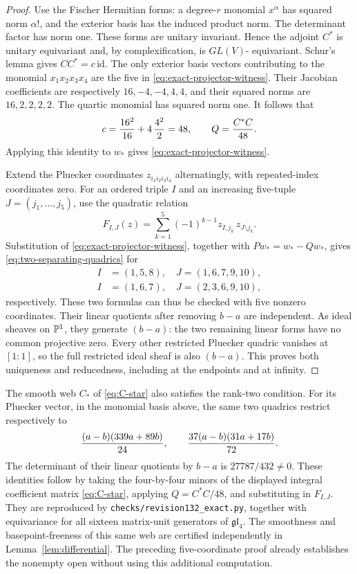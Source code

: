 \begin{proof}
Use the Fischer Hermitian forms: a degree-\(r\) monomial
\(x^\alpha\) has squared norm \(\alpha!\), and the exterior
basis has the induced product norm.  The determinant factor has norm
one.  These forms are unitary invariant.  Hence the adjoint \(C^*\)
is unitary equivariant and, by complexification, is \(GL(V)\)-
equivariant.  Schur's lemma gives \(CC^*=c\,\mathrm{id}\).
The only exterior basis vectors contributing to the monomial
\(x_1x_2x_3x_4\) are the five in
\eqref{eq:exact-projector-witness}.  Their Jacobian coefficients
are respectively \(16,-4,-4,4,4\), and their squared norms are
\(16,2,2,2,2\).  The quartic monomial has squared norm one.
It follows that
\[
 c={16^2\over16}+4\,{4^2\over2}=48,
 \qquad Q={C^*C\over48}.
\]
Applying this identity to \(w_*\) gives
\eqref{eq:exact-projector-witness}.

Extend the Pluecker coordinates \(z_{i_1i_2i_3i_4}\)
alternatingly, with repeated-index coordinates zero.  For an ordered
triple \(I\) and an increasing five-tuple \(J=(j_1,\ldots,j_5)\),
use the quadratic relation
\[
 F_{I,J}(z)=\sum_{k=1}^5(-1)^{k-1}
              z_{I,j_k}\,z_{J\setminus j_k}.
\]
Substitution of \eqref{eq:exact-projector-witness}, together with
\(Pw_*=w_*-Qw_*\), gives \eqref{eq:two-separating-quadrics}
for
\[
 \begin{split}
 I&=(1,5,8),\quad J=(1,6,7,9,10),\\
 I&=(1,6,7),\quad J=(2,3,6,9,10),
 \end{split}
\]
respectively.  These two formulas can thus be checked with five
nonzero coordinates.  Their linear quotients after removing
\(b-a\) are independent.  As ideal sheaves on \(\mathbb P^1\),
they generate \((b-a)\): the two remaining linear forms have no
common projective zero.  Every other restricted Pluecker quadric
vanishes at \([1:1]\), so the full restricted ideal sheaf is also
\((b-a)\).  This proves both uniqueness and reducedness, including
at the endpoints and at infinity.
\end{proof}

\begin{remark}
The smooth web \(C_*\) of \eqref{eq:C-star} also satisfies the
rank-two condition.  For its Pluecker vector, in the monomial basis
above, the same two quadrics restrict respectively to
\[
 { (a-b)(339a+89b)\over24},\qquad
 {37(a-b)(31a+17b)\over72}.
\]
The determinant of their linear quotients by \(b-a\) is
\(27787/432\ne0\).  These identities follow by taking the
four-by-four minors of the displayed integral coefficient matrix
\eqref{eq:C-star}, applying \(Q=C^*C/48\), and substituting in
\(F_{I,J}\).  They are reproduced by
\texttt{checks/revision132\_exact.py}, together with equivariance
for all sixteen matrix-unit generators of \(\mathfrak{gl}_4\).
The smoothness and basepoint-freeness of this same web are certified
independently in Lemma~\ref{lem:differential}.  The preceding
five-coordinate proof already establishes the nonempty open without
using this additional computation.
\end{remark}

